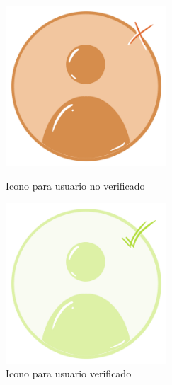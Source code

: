 \documentclass[a4paper, 12pt]{article}
\begin{document}
\begin{figure}[H]
   	\begin{minipage}{0.48\textwidth}
		\begin{center}
			{\includegraphics[width=6cm]{USERNV.png}\par}
			\caption{Icono para usuario no verificado}
		\end{center}  
	\end{minipage}\hfill
   	\begin{minipage}{0.48\textwidth}
		\begin{center}
			{\includegraphics[width=6cm]{USERV.png}\par}
			\caption{Icono para usuario verificado}
		\end{center}  
	\end{minipage}\hfill
\end{figure}
\end{document}

